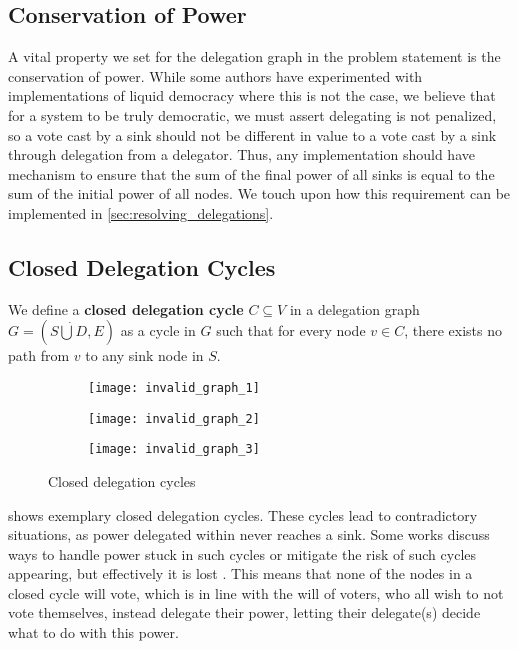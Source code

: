  \subsection{Conservation of Power}
 
 A vital property we set for the delegation graph in the problem statement is the conservation of power. While some authors have experimented with implementations of liquid democracy where this is not the case, we believe that for a system to be truly democratic, we must assert delegating is not penalized, so a vote cast by a sink should not be different in value to a vote cast by a sink through delegation from a delegator. \cite{bersetcheGeneralizingLiquidDemocracy2022, boldiViscousDemocracySocial2011} Thus, any implementation should have mechanism to ensure that the sum of the final power of all sinks is equal to the sum of the initial power of all nodes. We touch upon how this requirement can be implemented in \cref{sec:resolving_delegations}.

\subsection{Closed Delegation Cycles}
\label{subsec:cdc}

We define a \textbf{closed delegation cycle} $C \subseteq V$ in a delegation graph $G = (S \dot\bigcup D, E)$ as a cycle in $G$ such that for every node $v \in C$, there exists no path from $v$ to any sink node in $S$.

\begin{figure}[t]
    \centering
    \begin{subfigure}[t]{0.32\textwidth}
        \centering
        \texttt{[image: invalid\_graph\_1]}
    \end{subfigure}
    \hfill
    \begin{subfigure}[t]{0.32\textwidth}
        \centering
        \texttt{[image: invalid\_graph\_2]}
    \end{subfigure}
    \hfill
    \begin{subfigure}[t]{0.32\textwidth}
        \centering
        \texttt{[image: invalid\_graph\_3]}
    \end{subfigure}
    \caption{Closed delegation cycles}
    \label{fig:closed-delegation-cycles}
\end{figure}

 shows exemplary closed delegation cycles. These cycles lead to contradictory situations, as power delegated within never reaches a sink. Some works discuss ways to handle power stuck in such cycles or mitigate the risk of such cycles appearing, but effectively it is lost \cite{behrensCircularDelegationsMyth2015, brillInteractiveDemocracy2018}. This means that none of the nodes in a closed cycle will vote, which is in line with the will of voters, who all wish to not vote themselves, instead delegate their power, letting their delegate(s) decide what to do with this power. 

